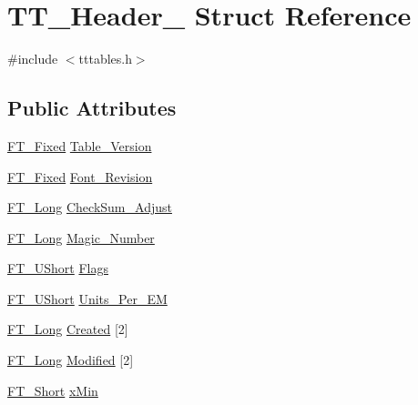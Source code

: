 \hypertarget{struct_t_t___header__}{\section{T\-T\-\_\-\-Header\-\_\- Struct Reference}
\label{struct_t_t___header__}
}


{\ttfamily \#include $<$tttables.\-h$>$}

\subsection*{Public Attributes}
\begin{DoxyCompactItemize}
\item 
\hyperlink{fttypes_8h_a5f5a679cc09f758efdd0d1c5feed3c3d}{F\-T\-\_\-\-Fixed} \hyperlink{struct_t_t___header___ab14622e8f8f80ee8361f4847cf9c36e1}{Table\-\_\-\-Version}
\item 
\hyperlink{fttypes_8h_a5f5a679cc09f758efdd0d1c5feed3c3d}{F\-T\-\_\-\-Fixed} \hyperlink{struct_t_t___header___aa5d0f9f88a7ffc755982a1a9dbb58f21}{Font\-\_\-\-Revision}
\item 
\hyperlink{fttypes_8h_a7fa72a1f0e79fb1860c5965789024d6f}{F\-T\-\_\-\-Long} \hyperlink{struct_t_t___header___a5ca008fa01e9568769287febc2abd807}{Check\-Sum\-\_\-\-Adjust}
\item 
\hyperlink{fttypes_8h_a7fa72a1f0e79fb1860c5965789024d6f}{F\-T\-\_\-\-Long} \hyperlink{struct_t_t___header___a24e0dde7596c7303c8b8872feb1c221f}{Magic\-\_\-\-Number}
\item 
\hyperlink{fttypes_8h_a937f6c17cf5ffd09086d8610c37b9f58}{F\-T\-\_\-\-U\-Short} \hyperlink{struct_t_t___header___a9e81d0e6bf9a83ebf28f768d83559f38}{Flags}
\item 
\hyperlink{fttypes_8h_a937f6c17cf5ffd09086d8610c37b9f58}{F\-T\-\_\-\-U\-Short} \hyperlink{struct_t_t___header___a594567319e6b6b5a823567279d26857d}{Units\-\_\-\-Per\-\_\-\-E\-M}
\item 
\hyperlink{fttypes_8h_a7fa72a1f0e79fb1860c5965789024d6f}{F\-T\-\_\-\-Long} \hyperlink{struct_t_t___header___a1e5d99f35ae2a604c6f54da94dc5105f}{Created} \mbox{[}2\mbox{]}
\item 
\hyperlink{fttypes_8h_a7fa72a1f0e79fb1860c5965789024d6f}{F\-T\-\_\-\-Long} \hyperlink{struct_t_t___header___a48db8e244aee26da683240e67644619e}{Modified} \mbox{[}2\mbox{]}
\item 
\hyperlink{fttypes_8h_aa7279be89046a2563cd3d4d6651fbdcf}{F\-T\-\_\-\-Short} \hyperlink{struct_t_t___header___ae4553d76427d9f7a28595ed71897dcbb}{x\-Min}

\end{DoxyCompactItemize}
